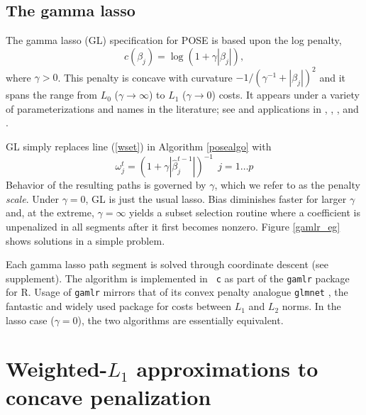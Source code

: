 \documentclass[twoside]{article}
\begin{document}
\subsection{The gamma lasso}
\label{sec:gamlr}

The gamma lasso (GL) specification for POSE is based upon the log penalty,
\begin{equation}\label{logpen}
c(\beta_j) =  \log(1+\gamma|\beta_j|),
\end{equation} where $\gamma > 0$.  This
penalty is concave with curvature $-1/(\gamma^{-1}+|\beta_j|)^2$ and it spans the
range from $L_0$ ($\gamma\rightarrow \infty$) to $L_1$ ($\gamma\rightarrow 0$)
costs.  It appears under a variety of parameterizations and names in the
literature; see
\citet{mazumder_sparsenet_2011} and applications in
\citet{friedman_fast_2008}, \citet{candes_enhancing_2008},
\citet{cevher_learning_2009}, \citet{taddy_multinomial_2013} and \citet{armagan_generalized_2013}. 

GL simply replaces line (\ref{wset}) in Algorithm \ref{posealgo}  with
\begin{equation}\label{gammalasso}
\omega^{t}_j  = \left(1 + \gamma |\hat\beta^{t-1}_j|\right)^{-1} ~~j=1\ldots p 
\end{equation}
Behavior of the resulting paths  is governed by $\gamma$, which we refer to as the
penalty {\it scale}.  Under $\gamma=0$, GL is just the usual lasso.
 Bias diminishes faster for larger $\gamma$ and, at the  extreme,
$\gamma=\infty$ yields a subset selection routine where a coefficient is
unpenalized in all segments after it first becomes nonzero. Figure
\ref{gamlr_eg} shows solutions in a simple problem.


Each  gamma lasso path segment is solved through coordinate descent (see supplement).  The algorithm is implemented in {\tt
c} as part of the {\tt gamlr} package for {\sf R}. 
Usage of {\tt gamlr} mirrors that of its
convex penalty analogue {\tt glmnet} \citep{friedman_regularization_2010}, the
fantastic and widely used package for costs between $L_1$ and $L_2$ norms. In
the lasso case ($\gamma=0$), the two algorithms are essentially equivalent.


\section{Weighted-$L_1$ approximations to concave penalization}
\label{sec:weighted}
\end{document}
